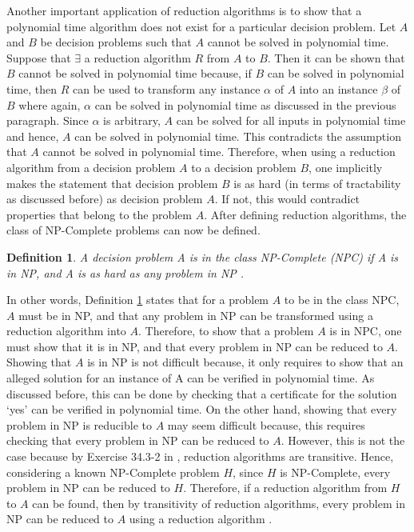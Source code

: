 \documentclass[12pt]{article}
\newtheorem{definition}{Definition}[subsection]
\numberwithin{equation}{subsection}
\numberwithin{table}{subsection}
\numberwithin{algorithm}{subsection}
\begin{document}
Another important application of reduction algorithms is to show that a polynomial time algorithm does not exist for a particular decision problem. Let $\mathit{A}$ and $\mathit{B}$ be decision problems such that $\mathit{A}$ cannot be solved in polynomial time. Suppose that $\exists$ a reduction algorithm $\mathit{R}$ from $\mathit{A}$ to $\mathit{B}$. Then it can be shown that $\mathit{B}$ cannot be solved in polynomial time because, if $\mathit{B}$ can be solved in polynomial time, then $\mathit{R}$ can be used to transform any instance $\alpha$ of $\mathit{A}$ into an instance $\beta$ of $\mathit{B}$ where again, $\alpha$ can be solved in polynomial time as discussed in the previous paragraph. Since $\alpha$ is arbitrary, $\mathit{A}$ can be solved for all inputs in polynomial time and hence, $\mathit{A}$ can be solved in polynomial time. This contradicts the assumption that $\mathit{A}$ cannot be solved in polynomial time. Therefore, when using a reduction algorithm from a decision problem $\mathit{A}$ to a decision problem $\mathit{B}$, one implicitly makes the statement that decision problem $\mathit{B}$ is as hard (in terms of tractability as discussed before) as decision problem $\mathit{A}$. If not, this would contradict properties that belong to the problem $\mathit{A}$. After defining reduction algorithms, the class of NP-Complete problems can now be defined. \cite{cormen_leiserson_rivest_stein}
\begin{definition}
\label{NPC}
A decision problem A is in the class NP-Complete (NPC) if A is in NP, and A is as hard as any problem in NP { }.
\end{definition}
In other words, Definition \ref{NPC} states that for a problem $\mathit{A}$ to be in the class NPC, $\mathit{A}$ must be in NP, and that any problem in NP can be transformed using a reduction algorithm into $\mathit{A}$. Therefore, to show that a problem $\mathit{A}$ is in NPC, one must show that it is in NP, and that every problem in NP can be reduced to $\mathit{A}$. Showing that $\mathit{A}$ is in NP is not difficult because, it only requires to show that an alleged solution for an instance of A can be verified in polynomial time. As discussed before, this can be done by checking that a certificate for the solution `yes' can be verified in polynomial time. On the other hand, showing that every problem in NP is reducible to $\mathit{A}$ may seem difficult because, this requires checking that every problem in NP can be reduced to $\mathit{A}$. However, this is not the case because by Exercise 34.3-2 in \cite{cormen_leiserson_rivest_stein}, reduction algorithms are transitive. Hence, considering a known NP-Complete problem $\mathit{H}$, since $\mathit{H}$ is NP-Complete, every problem in NP can be reduced to $\mathit{H}$. Therefore, if a reduction algorithm from $\mathit{H}$ to $\mathit{A}$ can be found, then by transitivity of reduction algorithms, every problem in NP can be reduced to $\mathit{A}$ using a reduction algorithm \cite{cormen_leiserson_rivest_stein}.\\\\
\end{document}
